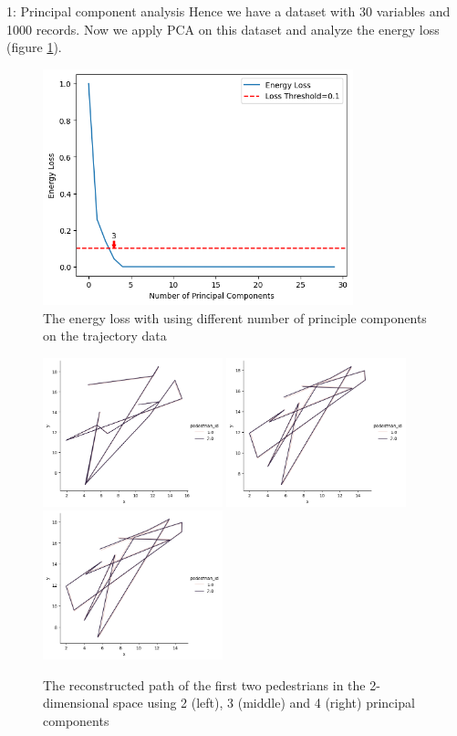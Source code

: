 \documentclass[10pt,a4paper]{article}
\begin{document}
\begin{task}{1: Principal component analysis}
Hence we have a dataset with 30 variables and 1000 records. Now we apply PCA on this dataset and analyze the energy loss (figure \ref{fig:task1-3-loss}).

\begin{figure} [H]
    \centering
    \includegraphics[width=9cm]{images/task1-3-loss.png}
    \caption{The energy loss with using different number of principle components on the trajectory data}
    \label{fig:task1-3-loss}
\end{figure}

\begin{figure} [H]
    \centering
    \includegraphics[width=5.2cm]{images/task1-3-2.png}
    \includegraphics[width=5.2cm]{images/task1-3-3.png}
    \includegraphics[width=5.2cm]{images/task1-3-4.png}
    \caption{The reconstructed path of the first two pedestrians in the 2-dimensional space using 2 (left), 3 (middle) and 4 (right) principal components}
    \label{fig:task1-3-2}
\end{figure}


\end{task}
\end{document}
